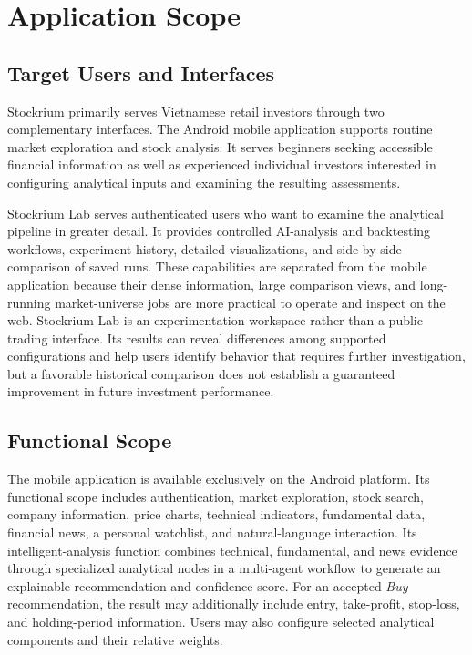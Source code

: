\section{Application Scope}
\label{sec:application-scope}

\subsection{Target Users and Interfaces}

Stockrium primarily serves Vietnamese retail investors through two complementary interfaces. The Android mobile application supports routine market exploration and stock analysis. It serves beginners seeking accessible financial information as well as experienced individual investors interested in configuring analytical inputs and examining the resulting assessments.

Stockrium Lab serves authenticated users who want to examine the analytical pipeline in greater detail. It provides controlled AI-analysis and backtesting workflows, experiment history, detailed visualizations, and side-by-side comparison of saved runs. These capabilities are separated from the mobile application because their dense information, large comparison views, and long-running market-universe jobs are more practical to operate and inspect on the web. Stockrium Lab is an experimentation workspace rather than a public trading interface. Its results can reveal differences among supported configurations and help users identify behavior that requires further investigation, but a favorable historical comparison does not establish a guaranteed improvement in future investment performance.

\subsection{Functional Scope}

The mobile application is available exclusively on the Android platform. Its functional scope includes authentication, market exploration, stock search, company information, price charts, technical indicators, fundamental data, financial news, a personal watchlist, and natural-language interaction. Its intelligent-analysis function combines technical, fundamental, and news evidence through specialized analytical nodes in a multi-agent workflow to generate an explainable recommendation and confidence score. For an accepted \textit{Buy} recommendation, the result may additionally include entry, take-profit, stop-loss, and holding-period information. Users may also configure selected analytical components and their relative weights.

